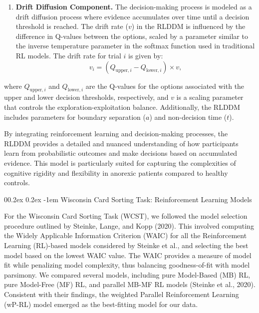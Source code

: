 \documentclass[
  man]{apa6}
\makeatletter
\providecommand{\tightlist}{%
  \setlength{\itemsep}{0pt}\setlength{\parskip}{0pt}}
\let\oldparagraph\paragraph
\renewcommand{\paragraph}{
    \@ifstar
      \xxxParagraphStar
      \xxxParagraphNoStar
  }
\newcommand{\xxxParagraphStar}[1]{\oldparagraph*{#1}\mbox{}}
\newcommand{\xxxParagraphNoStar}[1]{\oldparagraph{#1}\mbox{}}
\renewcommand{\paragraph}{\@startsection{paragraph}{4}{\parindent}%
  {0\baselineskip \@plus 0.2ex \@minus 0.2ex}%
  {-1em}%
  {\normalfont\normalsize\bfseries\itshape\typesectitle}}
\makeatother
\begin{document}
\begin{enumerate}
\def\labelenumi{\arabic{enumi}.}
\setcounter{enumi}{1}
\tightlist
\item
  \textbf{Drift Diffusion Component.} The decision-making process is modeled as a drift diffusion process where evidence accumulates over time until a decision threshold is reached. The drift rate (\(v\)) in the RLDDM is influenced by the difference in Q-values between the options, scaled by a parameter similar to the inverse temperature parameter in the softmax function used in traditional RL models. The drift rate for trial \(i\) is given by:
  \[
    v_i = (Q_{\text{upper},i} - Q_{\text{lower},i}) \times v,
    \]
\end{enumerate}

where \(Q_{\text{upper},i}\) and \(Q_{\text{lower},i}\) are the Q-values for the options associated with the upper and lower decision thresholds, respectively, and \(v\) is a scaling parameter that controls the exploration-exploitation balance. Additionally, the RLDDM includes parameters for boundary separation (\(a\)) and non-decision time (\(t\)).

By integrating reinforcement learning and decision-making processes, the RLDDM provides a detailed and nuanced understanding of how participants learn from probabilistic outcomes and make decisions based on accumulated evidence. This model is particularly suited for capturing the complexities of cognitive rigidity and flexibility in anorexic patients compared to healthy controls.

\paragraph{Wisconsin Card Sorting Task: Reinforcement Learning Models}\label{wisconsin-card-sorting-task-reinforcement-learning-models}

For the Wisconsin Card Sorting Task (WCST), we followed the model selection procedure outlined by Steinke, Lange, and Kopp (2020). This involved computing the Widely Applicable Information Criterion (WAIC) for all the Reinforcement Learning (RL)-based models considered by Steinke et al., and selecting the best model based on the lowest WAIC value. The WAIC provides a measure of model fit while penalizing model complexity, thus balancing goodness-of-fit with model parsimony. We compared several models, including pure Model-Based (MB) RL, pure Model-Free (MF) RL, and parallel MB-MF RL models (Steinke et al., 2020). Consistent with their findings, the weighted Parallel Reinforcement Learning (wP-RL) model emerged as the best-fitting model for our data.
\end{document}
